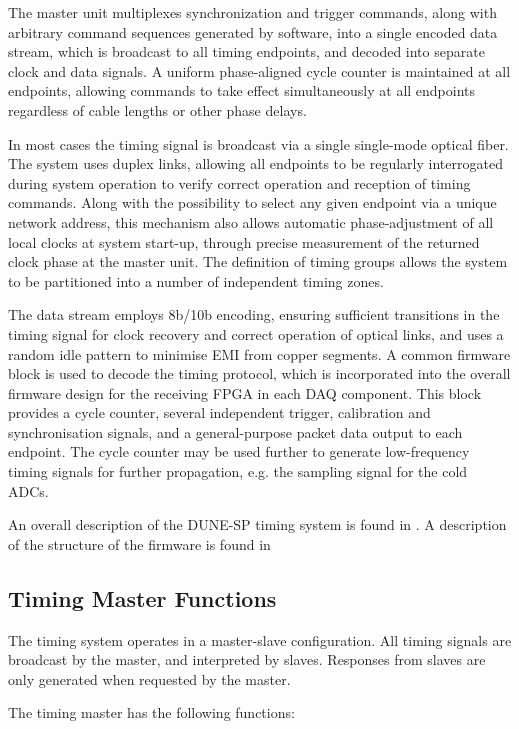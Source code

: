 \documentclass{dune}
\begin{document}
The master unit multiplexes
synchronization and trigger commands, along with arbitrary command
sequences generated by software, into a single encoded data stream,
which is broadcast to all timing endpoints, and decoded into separate clock
and data signals. A uniform phase-aligned cycle counter is maintained at all endpoints,
allowing commands to take effect simultaneously at all endpoints
regardless of cable lengths or other phase delays.

In most cases the timing signal is broadcast via a single single-mode optical fiber. The system uses duplex links, allowing all endpoints
to be regularly interrogated during system operation to verify correct operation
and reception of timing commands. Along with the possibility to select
any given endpoint via a unique network address, this mechanism also allows
automatic phase-adjustment of all local clocks at system start-up,
through precise measurement of the returned clock phase at the master unit. The definition
of timing groups allows the system to be partitioned into a number of
independent timing zones.


The data stream employs 8b/10b encoding, ensuring sufficient transitions in the
timing signal for clock recovery and correct operation of optical links, and uses a random idle 
pattern to minimise EMI from copper segments. A common firmware block is used to
decode the timing protocol, which is incorporated into the overall
firmware design for the receiving FPGA in each DAQ component. This
block provides a cycle counter, several independent trigger, calibration and 
synchronisation signals, and a general-purpose packet data output to each endpoint.
The cycle counter may be used further to generate low-frequency timing signals for
further propagation, e.g. the sampling signal for the cold ADCs.

An overall description of the DUNE-SP timing system is found in \cite{ref:dts-sp-description}. A description of the structure of the firmware is found in \cite{ref:dts-sp-firmware}


\subsection{Timing Master Functions}

The timing system operates in a master-slave configuration. All timing signals are broadcast by the master, and interpreted by slaves. Responses from slaves are only generated when requested by the master.

The timing master has the following functions:
\end{document}

